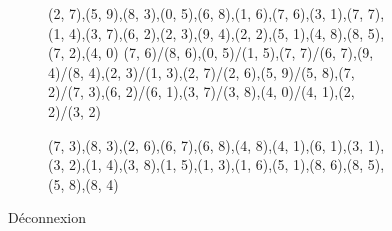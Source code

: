 \begin{figure}[h!]
  \centering
  \begin{subfigure}[b]{0.40\textwidth}
    \resizebox{\linewidth}{!} {
       {{(2, 7),(5, 9),(8, 3),(0, 5),(6, 8),(1, 6),(7, 6),(3,
      1),(7, 7),(1, 4),(3, 7),(6, 2),(2, 3),(9, 4),(2, 2),(5, 1),(4, 8),(8,
      5),(7, 2),(4, 0)}} {{{(7, 6)/(8, 6)},{(0, 5)/(1, 5)},{(7, 7)/(6, 7)},{(9,
      4)/(8, 4)},{(2, 3)/(1, 3)},{(2, 7)/(2, 6)},{(5, 9)/(5, 8)},{(7, 2)/(7,
      3)},{(6, 2)/(6, 1)},{(3, 7)/(3, 8)},{(4, 0)/(4, 1)},{(2, 2)/(3, 2)}}}
    }
  \end{subfigure}
  \begin{subfigure}[b]{0.40\textwidth}
    \resizebox{\linewidth}{!} {
       {{(7, 3),(8, 3),(2, 6),(6, 7),(6, 8),(4, 8),(4, 1),(6,
      1),(3, 1),(3, 2),(1, 4),(3, 8),(1, 5),(1, 3),(1, 6),(5, 1),(8, 6),(8,
      5),(5, 8),(8, 4)}} {{}}
    }
  \end{subfigure}
  \caption{Déconnexion}
  \label{fig:deconnexion}
\end{figure}

